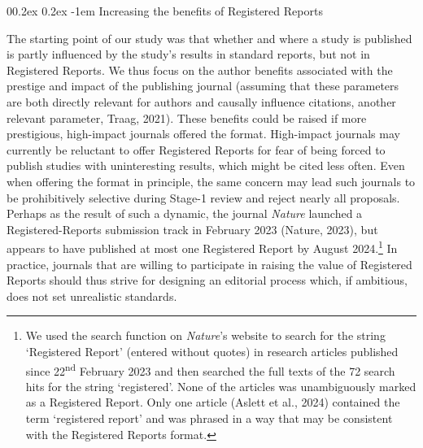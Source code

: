 \documentclass[
  british,
  a4paper,
  ,man,mask,floatsintext]{apa6}
\makeatletter
\let\oldparagraph\paragraph
\renewcommand{\paragraph}{
    \@ifstar
      \xxxParagraphStar
      \xxxParagraphNoStar
  }
\newcommand{\xxxParagraphStar}[1]{\oldparagraph*{#1}\mbox{}}
\newcommand{\xxxParagraphNoStar}[1]{\oldparagraph{#1}\mbox{}}
\renewcommand{\paragraph}{\@startsection{paragraph}{4}{\parindent}%
  {0\baselineskip \@plus 0.2ex \@minus 0.2ex}%
  {-1em}%
  {\normalfont\normalsize\bfseries\itshape\typesectitle}}
\makeatother
\begin{document}
\par\vspace{0.4\baselineskip}

\paragraph{Increasing the benefits of Registered Reports}\label{increasing-the-benefits-of-registered-reports}

The starting point of our study was that
whether and where a study is published is partly influenced by the study's results in standard reports, but not in Registered Reports.
We thus focus on the author benefits associated with the prestige and impact of the publishing journal (assuming that these parameters are both directly relevant for authors and causally influence citations, another relevant parameter, Traag, 2021).
These benefits could be raised if more prestigious, high-impact journals offered the format.
High-impact journals may currently be reluctant to offer
Registered Reports for fear of being forced to publish studies with uninteresting results, which might be cited less often.
Even when offering the format in principle, the same concern may lead such journals to be prohibitively selective during Stage-1 review and reject nearly all proposals.
Perhaps as the result of such a dynamic, the journal \emph{Nature} launched a Registered-Reports submission track in February 2023 (Nature, 2023), but appears to have published at most one Registered Report by August 2024.\footnote{We used the search function on \emph{Nature}'s website to search for the string `Registered Report' (entered without quotes) in research articles published since 22\textsuperscript{nd} February 2023 and then searched the full texts of the 72 search hits for the string `registered'. None of the articles was unambiguously marked as a Registered Report. Only one article (Aslett et al., 2024) contained the term `registered report' and was phrased in a way that may be consistent with the Registered Reports format.}
In practice, journals that are willing to participate in raising the value of Registered Reports should thus strive for designing an editorial process which, if ambitious, does not set unrealistic standards.
\end{document}
